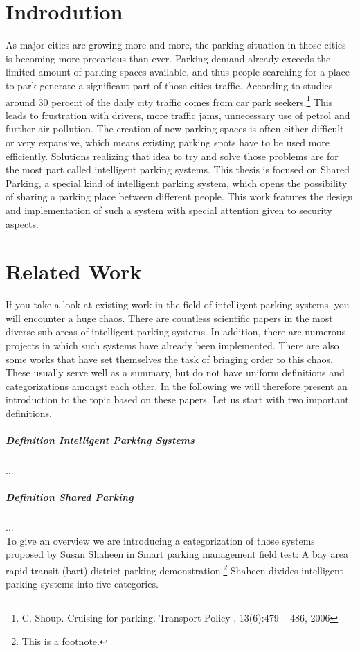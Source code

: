 \documentclass[
a4paper,     %
titlepage,   %
14pt         %
]{scrartcl}  %
\theoremstyle{mystyle}
\begin{document}
\section{Indrodution}
As major cities are growing more and more, the parking situation in those cities is becoming more precarious than ever. Parking demand already exceeds the limited amount of parking spaces available, and thus people searching for a place to park generate a significant part of those cities traffic. According to studies around 30 percent of the daily city traffic comes from car park seekers.\footnote{C. Shoup. Cruising for parking. Transport Policy , 13(6):479 – 486, 2006} This leads to frustration with drivers, more traffic jams, unnecessary use of petrol and further air pollution. The creation of new parking spaces is often either difficult or very expansive, which means existing parking spots have to be used more efficiently. Solutions realizing that idea to try and solve those problems are for the most part called intelligent parking systems. This thesis is focused on Shared Parking, a special kind of intelligent parking system, which opens the possibility of sharing a parking place between different people. This work features the design and implementation of such a system with special attention given to security aspects.

\section{Related Work}
If you take a look at existing work in the field of intelligent parking systems, you will encounter a huge chaos. There are countless scientific papers in the most diverse sub-areas of intelligent parking systems. In addition, there are numerous projects in which such systems have already been implemented. There are also some works that have set themselves the task of bringing order to this chaos. These usually serve well as a summary, but do not have uniform definitions and categorizations amongst each other. In the following we will therefore present an introduction to the topic based on these papers. Let us start with two important definitions.


\subparagraph{Definition Intelligent Parking Systems}
...

\subparagraph{Definition Shared Parking}
...\\

To give an overview we are introducing a categorization of those systems proposed by Susan Shaheen in Smart parking management field test: A bay area rapid transit (bart) district parking demonstration.\footnote{This is a footnote.} Shaheen divides intelligent parking systems into five categories.
\end{document}
